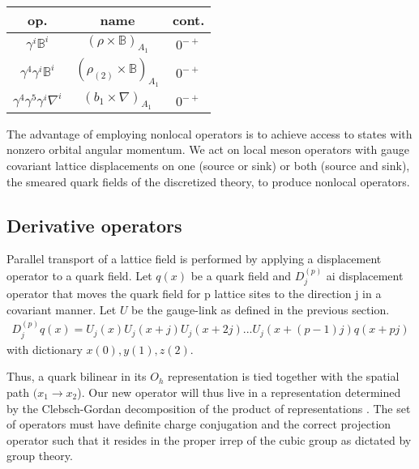\begin{tabular}{ccc}
    op. & name & cont. \\
    \hline
    $\gamma^i \mathbb{B}^i$ & $(\rho \times \mathbb{B})_{A_1}$ & $0^{-+}$ \\
    $\gamma^4 \gamma^i \mathbb{B}^i$ & $(\rho_{(2)} \times \mathbb{B})_{A_1}$ & $0^{-+}$ \\
    $\gamma^4 \gamma^5 \gamma^i \nabla^i$ & $(b_1 \times \nabla)_{A_1}$ & $0^{-+}$ \\
    \end{tabular}

The advantage of employing nonlocal operators is to achieve access to states with nonzero orbital angular momentum. We act on local meson operators with gauge covariant lattice displacements on one (source or sink) or both (source and sink), the smeared quark fields of the discretized theory, to produce nonlocal operators. 

\subsection{Derivative operators}
Parallel transport of a lattice field is performed by applying a displacement operator to a quark field.  Let $q(x)$ be a quark field and $D_j^{(p)}$ ai displacement operator that moves the quark field for p lattice sites to the direction j in a covariant manner. Let $U$ be the gauge-link as defined in the previous section.
\begin{align}
    D_j^{(p)} q(x) = U_j(x) U_j(x+j) U_j(x+2j)...U_j(x+(p-1)j) q(x+pj)
\end{align}
with dictionary $x(0), y(1), z(2)$.

Thus, a quark bilinear in its $O_h$ representation is tied together with the spatial path $(x_1 \to x_2$). Our new operator will thus live in a representation determined by the Clebsch-Gordan decomposition of the product of representations \cite{Basak_2005}. The set of operators must have definite charge conjugation and the correct projection operator such that it resides in the proper irrep of the cubic group as dictated by group theory.  

